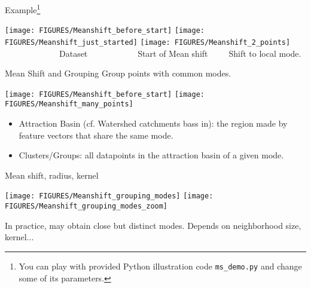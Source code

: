 \documentclass[9pt]{beamer}
\begin{document}
\begin{frame}{Example\footnote{You can play with provided Python illustration code \texttt{ms\_demo.py} and change some of its parameters.}}
  \begin{center}
    \texttt{[image: FIGURES/Meanshift\_before\_start]}\hfill
    \texttt{[image: FIGURES/Meanshift\_just\_started]}\hfill
    \texttt{[image: FIGURES/Meanshift\_2\_points]}\\
    ~~~~~~~~~~~~~Dataset~~~~~\hfill ~~~~~~~Start of Mean shift~~~~~\hfill Shift to local mode.
  \end{center}
\end{frame}

\begin{frame}{Mean Shift and Grouping}
  Group points with common modes.
 \begin{center}
    \texttt{[image: FIGURES/Meanshift\_before\_start]}\hfill
    \texttt{[image: FIGURES/Meanshift\_many\_points]}\\
  \end{center}
  \begin{itemize}
  \item   Attraction Basin (cf. Watershed catchments bass in): the region made
  by feature vectors that share the same mode.
\item Clusters/Groups: all datapoints in the attraction basin of a
  given mode.
  \end{itemize}
\end{frame}

\begin{frame}{Mean shift, radius, kernel}
 \begin{center}
    \texttt{[image: FIGURES/Meanshift\_grouping\_modes]}\hfill
    \texttt{[image: FIGURES/Meanshift\_grouping\_modes\_zoom]}\\
  \end{center}
  In practice, may obtain close but distinct modes. Depends on neighborhood size, kernel...
\end{frame}
\end{document}

